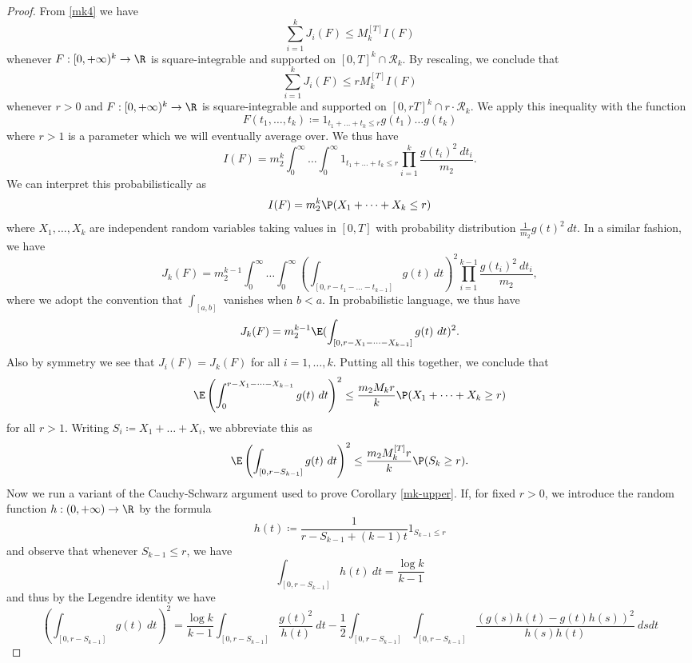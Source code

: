 \begin{proof}  From \eqref{mk4} we have
$$ \sum_{i=1}^k J_i(F) \leq M_k^{[T]} I(F)$$
whenever $F: [0,+\infty)^k \to \R$ is square-integrable and supported on $[0,T]^k \cap {\mathcal R}_k$.  By rescaling, we conclude that
$$ \sum_{i=1}^k J_i(F) \leq r M_k^{[T]} I(F)$$
whenever $r>0$ and $F: [0,+\infty)^k \to \R$ is square-integrable and supported on $[0,rT]^k \cap r \cdot {\mathcal R}_k$.  We apply this inequality with the function
$$ F(t_1,\dots,t_k) \coloneqq 1_{t_1+\dots+t_k \leq r} g(t_1) \dots g(t_k)$$
where $r>1$ is a parameter which we will eventually average over.  We thus have
$$ I(F) = m_2^k \int_0^\infty \dots \int_0^\infty 1_{t_1+\dots+t_k \leq r} \prod_{i=1}^k \frac{g(t_i)^2\ dt_i}{m_2}.$$
We can interpret this probabilistically as
$$ I(F) = m_2^k \P( X_1 + \dots + X_k \leq r )$$
where $X_1,\dots,X_k$ are independent random variables taking values in $[0,T]$ with probability distribution $\frac{1}{m_2} g(t)^2\ dt$.  In a similar fashion, we have
$$ J_k(F) = m_2^{k-1} \int_0^\infty \dots \int_0^\infty (\int_{[0,r-t_1-\dots-t_{k-1}]} g(t)\ dt)^2 \prod_{i=1}^{k-1} \frac{g(t_i)^2\ dt_i}{m_2},$$
where we adopt the convention that $\int_{[a,b]}$ vanishes when $b<a$.  In probabilistic language, we thus have
$$ J_k(F) = m_2^{k-1} \E (\int_{[0,r-X_1-\dots-X_{k-1}]} g(t)\ dt)^2.$$
Also by symmetry we see that $J_i(F)=J_k(F)$ for all $i=1,\dots,k$.  Putting all this together, we conclude that
$$\E \left(\int_0^{r-X_1-\dots-X_{k-1}} g(t)\ dt\right)^2 \leq \frac{m_2 M_k r}{k} \P( X_1 + \dots + X_k \geq r )$$
for all $r>1$.  Writing $S_i \coloneqq X_1 + \dots + X_i$, we abbreviate this as
\begin{equation}\label{rg1}
\E \left(\int_{[0,r-S_{k-1}]} g(t)\ dt\right)^2 \leq \frac{m_2 M_k^{[T]} r}{k} \P( S_k \geq r ).
\end{equation}
Now we run a variant of the Cauchy-Schwarz argument used to prove Corollary \ref{mk-upper}.  If, for fixed $r>0$, we introduce the random function $h: (0,+\infty) \to \R$ by the formula
\begin{equation}\label{hdef}
 h(t) \coloneqq \frac{1}{r-S_{k-1}+(k-1)t} 1_{S_{k-1} \leq r}
\end{equation}
and observe that whenever $S_{k-1} \leq r$, we have
\begin{equation}\label{h-int}
 \int_{[0,r-S_{k-1}]} h(t)\ dt = \frac{\log k}{k-1}
\end{equation}
and thus by the Legendre identity we have
$$ \left(\int_{[0,r-S_{k-1}]} g(t)\ dt\right)^2 = \frac{\log k}{k-1} \int_{[0,r-S_{k-1}]} \frac{g(t)^2}{h(t)}\ dt - \frac{1}{2} \int_{[0,r-S_{k-1}]} \int_{[0,r-S_{k-1}]} \frac{(g(s)h(t)-g(t)h(s))^2}{h(s)h(t)}\ ds dt$$

\end{proof}
